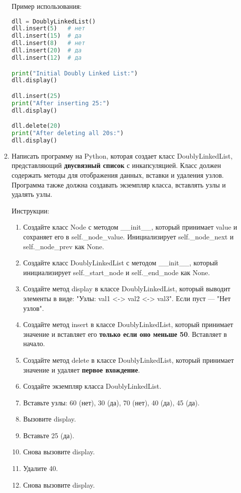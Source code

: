 \begin{enumerate}
Пример использования:
\begin{lstlisting}[language=Python]
dll = DoublyLinkedList()
dll.insert(5)   # нет
dll.insert(15)  # да
dll.insert(8)   # нет
dll.insert(20)  # да
dll.insert(12)  # да

print("Initial Doubly Linked List:")
dll.display()

dll.insert(25)
print("After inserting 25:")
dll.display()

dll.delete(20)
print("After deleting all 20s:")
dll.display()
\end{lstlisting}

\item Написать программу на Python, которая создает класс DoublyLinkedList, представляющий \textbf{двусвязный список} с инкапсуляцией. Класс должен содержать методы для отображения данных, вставки и удаления узлов. Программа также должна создавать экземпляр класса, вставлять узлы и удалять узлы.

Инструкции:
\begin{enumerate}
    \item Создайте класс Node с методом \_\_init\_\_, который принимает value и сохраняет его в self.\_node\_value. Инициализирует self.\_node\_next и self.\_node\_prev как None.
    \item Создайте класс DoublyLinkedList с методом \_\_init\_\_, который инициализирует self.\_start\_node и self.\_end\_node как None.
    \item Создайте метод display в классе DoublyLinkedList, который выводит элементы в виде: "Узлы: val1 <-> val2 <-> val3". Если пуст — "Нет узлов".
    \item Создайте метод insert в классе DoublyLinkedList, который принимает значение и вставляет его \textbf{только если оно меньше 50}. Вставляет в начало.
    \item Создайте метод delete в классе DoublyLinkedList, который принимает значение и удаляет \textbf{первое вхождение}.
    \item Создайте экземпляр класса DoublyLinkedList.
    \item Вставьте узлы: 60 (нет), 30 (да), 70 (нет), 40 (да), 45 (да).
    \item Вызовите display.
    \item Вставьте 25 (да).
    \item Снова вызовите display.
    \item Удалите 40.
    \item Снова вызовите display.
\end{enumerate}


\end{enumerate}
